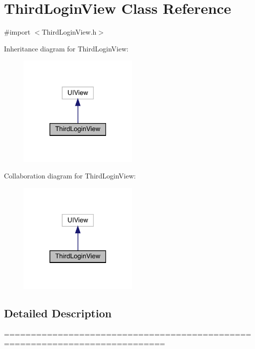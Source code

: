 \hypertarget{interface_third_login_view}{}\section{Third\+Login\+View Class Reference}
\label{interface_third_login_view}


{\ttfamily \#import $<$Third\+Login\+View.\+h$>$}



Inheritance diagram for Third\+Login\+View\+:\nopagebreak
\begin{figure}[H]
\begin{center}
\leavevmode
\includegraphics[width=165pt]{interface_third_login_view__inherit__graph}
\end{center}
\end{figure}


Collaboration diagram for Third\+Login\+View\+:\nopagebreak
\begin{figure}[H]
\begin{center}
\leavevmode
\includegraphics[width=165pt]{interface_third_login_view__coll__graph}
\end{center}
\end{figure}


\subsection{Detailed Description}
============================================================================


